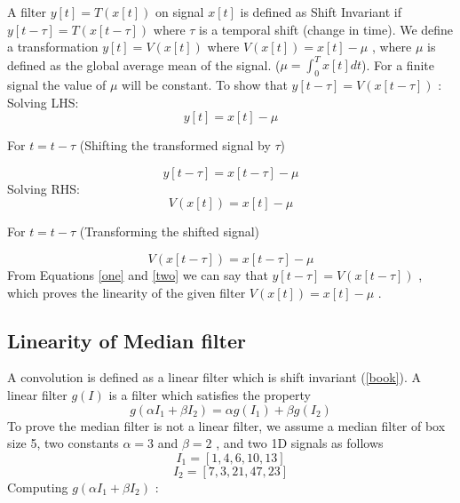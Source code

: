 \documentclass[a4paper,11pt]{article}
\begin{document}
A filter ${y[t] = T(x[t])}$ on signal $x[t]$ is defined as Shift Invariant if ${y[t-\tau] =T(x[t-\tau])}$ where $\tau$ is a temporal shift (change in time).
\newline
\newline We define a transformation ${y[t] = V(x[t])}$ where ${V(x[t]) = x[t] - \mu}$ , where $\mu$ is defined as the global average mean of the signal. (${\mu = \int_{0}^{T} x[t] dt}$).
\newline
\newline For a finite signal the value of $\mu$ will be constant. 
\newline
\newline To show that ${y[t-\tau] =V(x[t-\tau])}$ :
\newline
\newline Solving LHS: 
\[
y[t] = x[t]- \mu
\]
\begin{center}
For $t = t-\tau$ (Shifting the transformed signal by $\tau$)
\end{center}
\begin{equation}
\label{one}
    y[t-\tau] = x[t-\tau] - \mu
\end{equation}
\newline
Solving RHS:
\[
V(x[t]) = x[t]- \mu
\]
\begin{center}
For $t = t-\tau$ (Transforming the shifted signal)
\end{center}
\begin{equation}
\label{two}
    V(x[t-\tau]) = x[t-\tau] - \mu
\end{equation}
\newline
From Equations \ref{one} and \ref{two} we can say that ${y[t-\tau] =V(x[t-\tau])}$ , which proves the linearity of the given filter ${V(x[t]) = x[t] - \mu}$ .


\subsection{Linearity of Median filter}

A convolution is defined as a linear filter which is shift invariant (\ref{book}). A linear filter $g(I)$ is a filter which satisfies the property $$g(\alpha I_1 + \beta I_2) = \alpha g(I_1) + \beta g(I_2)$$
\newline
To prove the median filter is not a linear filter, we assume a median filter of box size 5, two constants $\alpha = 3$ and $\beta = 2$ , and two 1D signals as follows
$$I_1 = [1,4,6,10,13]$$
$$I_2 = [7,3,21,47,23]$$
\newline
Computing $g(\alpha I_1 + \beta I_2)$ :
\end{document}

